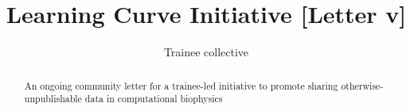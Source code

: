 \documentclass[9pt,lessons]{livecoms}
\title{Learning Curve Initiative [Letter v\versionnumber]}
\author[1*]{Trainee collective}
\theoremstyle{definition}
\theoremstyle{remark}
\begin{document}
\begin{frontmatter}

\maketitle

\begin{abstract}
   An ongoing community letter for a trainee-led initiative to promote sharing otherwise-unpublishable data in computational biophysics
\end{abstract}

\end{frontmatter}


\end{document}
